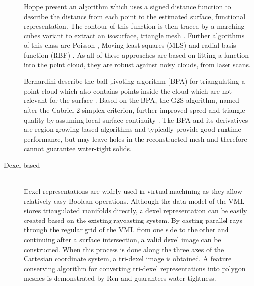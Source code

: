 \begin{description}
	Hoppe \etal present an algorithm which uses a signed distance function to describe the distance from each point to the estimated surface, \ie functional representation.
	The contour of this function is then traced by a marching cubes variant to extract an isosurface, \ie triangle mesh \cite{sdf_surface_reconstruction}.
	Further algorithms of this class are Poisson \cite{poisson}, Moving least squares (MLS) \cite{mls} and radial basis function (RBF) \cite{rbf}.
	As all of these approaches are based on fitting a function into the point cloud, they are robust against noisy clouds, \eg from laser scans.

	Bernardini \etal describe the ball-pivoting algorithm (BPA) for triangulating a point cloud which also contains points inside the cloud which are not relevant for the surface \cite{bpa}.
	Based on the BPA, the G2S algorithm, named after the Gabriel 2-simplex criterion, further improved speed and triangle quality by assuming local surface continuity \cite{g2s}.
	The BPA and its derivatives are region-growing based algorithms and typically provide good runtime performance, but may leave holes in the reconstructed mesh and therefore cannot guarantee water-tight solids.


	\item[Dexel based] \hfill \\
	Dexel representations are widely used in virtual machining as they allow  relatively easy Boolean operations.
	Although the data model of the VML stores triangulated manifolds directly, a dexel representation can be easily created based on the existing raycasting system.
	By casting parallel rays through the regular grid of the VML from one side to the other and continuing after a surface intersection, a valid dexel image can be constructed.
	When this process is done along the three axes of the Cartesian coordinate system, a tri-dexel image is obtained.
	A feature conserving algorithm for converting tri-dexel representations into polygon meshes is demonstrated by Ren \etal \cite{tridexel_reconstruction} and guarantees water-tightness.



\end{description}

